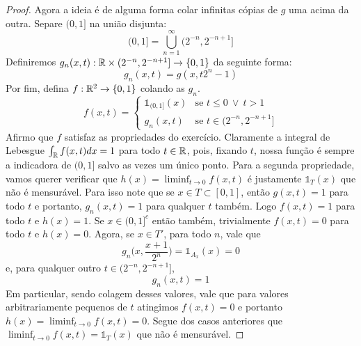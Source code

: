 \begin{proof}
    Agora a  ideia é de alguma forma colar infinitas cópias de $g$ uma acima da outra.
    Separe $(0,1]$ na união disjunta:
    $$(0,1] = \bigcup_{n=1}^{\infty} (2^{-n}, 2^{-n + 1}]$$
    Definiremos $g_n(x,t) : \mathbb{R} \times (2^{-n},2^{-n + 1}] \rightarrow \{0,1\}$ da seguinte forma:
    $$g_n(x, t) = g(x, t2^n - 1)$$
    Por fim, defina $f :\mathbb{R}^2 \rightarrow \{0,1\}$ colando as $g_n$.
    $$f(x,t) = \begin{cases}
        \mathds{1}_{(0,1]}(x) & \text{se } t \leq 0 \ \lor \ t > 1\\
        g_n(x,t) & \text{se } t \in (2^{-n}, 2^{-n + 1}] 
    \end{cases}$$
    Afirmo que $f$ satisfaz as propriedades do exercício. Claramente a integral de 
    Lebesgue $\int_{\mathbb{R}} f(x,t) dx = 1$ para todo $t \in \mathbb{R}$, pois, fixando $t$, nossa 
    função é sempre a indicadora de $(0,1]$ salvo as vezes um único ponto. Para a segunda propriedade,
    vamos querer verificar que $h(x) = \liminf_{t \to 0} f(x,t)$ é justamente $\mathds{1}_T(x)$ que não é mensurável.
    Para isso note que se $x \in T \subset [0,1]$, então $g(x,t) = 1$ para todo $t$ e portanto, $g_n(x,t) = 1$ para qualquer $t$ também.
    Logo $f(x,t) = 1$ para todo $t$ e $h(x) = 1$. Se $x \in (0,1]^c$ então também, trivialmente $f(x,t) = 0$ para todo $t$
    e $h(x) = 0$. Agora, se $x \in T'$, para todo $n$, vale que 
    $$g_n\bigg(x, \frac{x + 1}{2^n}\bigg) = \mathds{1}_{A_x}(x) = 0$$
    e, para qualquer outro $t \in (2^{-n}, 2^{-n + 1}]$,
    $$g_n(x, t) = 1$$
    Em particular, sendo colagem desses valores, vale que para valores arbitrariamente pequenos de $t$ atingimos
    $f(x,t) = 0$ e portanto $h(x) = \liminf_{t \to 0} f(x,t) = 0$. Segue dos casos anteriores que $\liminf_{t \to 0} f(x,t)= \mathds{1}_T(x)$
    que não é mensurável.
\end{proof}


